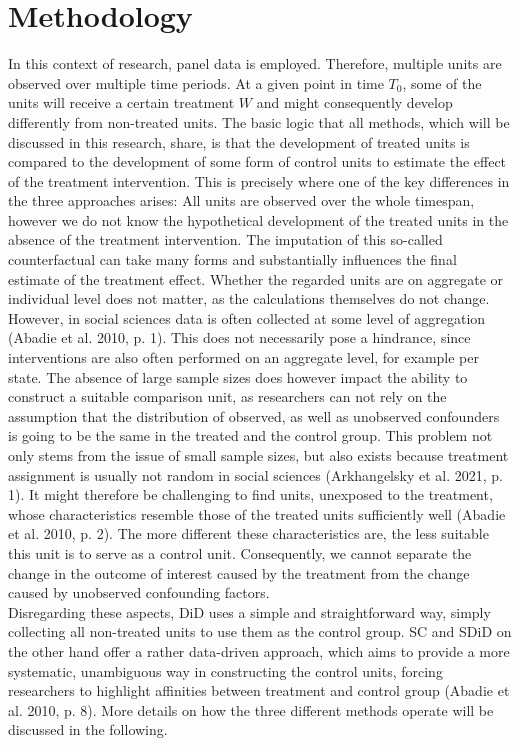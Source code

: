 \documentclass[8pt]{article}
\begin{document}
\section{Methodology}
In this context of research, panel data is employed. Therefore, multiple units are observed over multiple time periods.
At a given point in time $T_0$, some of the units will receive a certain treatment $W$  and might consequently develop differently from non-treated units. The basic logic that all methods, which will be discussed in this research, share, is that the development of treated units is compared to the development of some form of control units to estimate the effect of the treatment intervention. 
This is precisely where one of the key differences in the three approaches arises: All units are observed over the whole timespan, however we do not know the hypothetical development of the treated units in the absence of the treatment intervention. The imputation of this so-called counterfactual can take many forms and substantially influences the final estimate of the treatment effect. 
Whether the regarded units are on aggregate or individual level does not matter, as the calculations themselves do not change. However, in social sciences data is often collected at some level of aggregation (Abadie et al. 2010, p. 1). This does not necessarily pose a hindrance, since interventions are also often performed on an aggregate level, for example per state. The absence of large sample sizes does however impact the ability to construct a suitable comparison unit, as researchers can not rely on the assumption that the distribution of observed, as well as unobserved confounders is going to be the same in the treated and the control group. This problem not only stems from the issue of small sample sizes, but also exists because treatment assignment is usually not random in social sciences (Arkhangelsky et al. 2021, p. 1). It might therefore be challenging to find units, unexposed to the treatment, whose characteristics resemble those of the treated units sufficiently well (Abadie et al. 2010, p. 2). The more different these characteristics are, the less suitable this unit is to serve as a control unit. Consequently, we cannot separate the change in the outcome of interest caused by the treatment from the change caused by unobserved confounding factors. \\	
Disregarding these aspects, DiD uses a simple and straightforward way, simply collecting all non-treated units to use them as the control group. SC and SDiD on the other hand offer a rather data-driven approach, which aims to provide a more systematic, unambiguous way in constructing the control units, forcing researchers to highlight affinities between treatment and control group (Abadie et al. 2010, p. 8). More details on how the three different methods operate will be discussed in the following.
\end{document}
